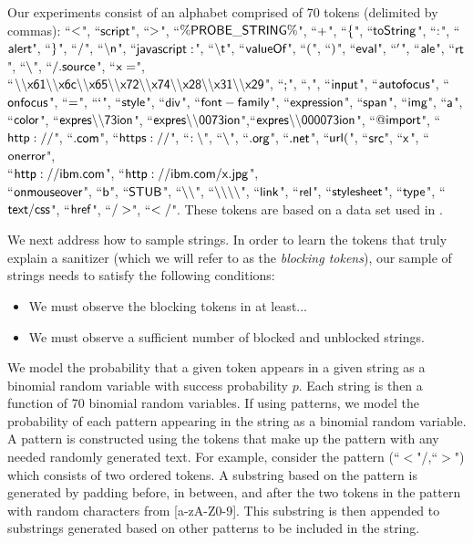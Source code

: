 Our experiments consist of an alphabet comprised of 70 tokens (delimited by commas): ``$\sf{<}$", ``$\sf{script}$", ``$\sf{>}$", ``$\sf{\%PROBE\_STRING\%}$", ``$\sf{+}$", ``$\sf{\{}$", ``$\sf{toString}$", ``$\sf{:}$", ``$\sf{alert}$", ``$\sf{\}}$", ``$\sf{/}$", ``$\sf{\backslash n}$", ``$\sf{javascript:}$", ``$\sf{\backslash t}$", ``$\sf{valueOf}$", ``$\sf{(}$", ``$\sf{)}$", ``$\sf{eval}$", ``$\sf{'}$", ``$\sf{ale}$", ``$\sf{rt}$", ``$\sf{\backslash }$", ``$\sf{/.source}$", ``$\sf{x=}$",\\ ``$\sf{\backslash \backslash x61\backslash \backslash x6c\backslash \backslash x65\backslash \backslash x72\backslash \backslash x74\backslash \backslash x28\backslash \backslash x31\backslash \backslash x29}$", ``$\sf{;}$", ``$\sf{,}$", ``$\sf{input}$", ``$\sf{autofocus}$", ``$\sf{onfocus}$", ``$\sf{=}$", ``$\sf{`}$", ``$\sf{style}$", ``$\sf{div}$", ``$\sf{font-family}$", ``$\sf{expression}$", ``$\sf{span}$", ``$\sf{img}$", ``$\sf{a}$", ``$\sf{color}$", ``$\sf{expres\backslash \backslash 73ion}$", ``$\sf{expres\backslash \backslash 0073ion}$",``$\sf{expres\backslash \backslash 000073ion}$", ``$\sf{@import}$", ``$\sf{http://}$", ``$\sf{.com}$", ``$\sf{https://}$", ``$\sf{:\backslash }$", ``$\sf{\backslash }$", ``$\sf{.org}$", ``$\sf{.net}$", ``$\sf{url(}$", ``$\sf{src}$", ``$\sf{x}$", ``$\sf{onerror}$",\\ ``$\sf{http://ibm.com}$", ``$\sf{http://ibm.com/x.jpg}$",\\ ``$\sf{onmouseover}$", ``$\sf{b}$", ``$\sf{STUB}$", ``$\sf{\backslash \backslash }$", ``$\sf{\backslash \backslash \backslash \backslash }$", ``$\sf{link}$", ``$\sf{rel}$", ``$\sf{stylesheet}$", ``$\sf{type}$", ``$\sf{text/css}$", ``$\sf{href}$", ``$\sf{/>}$", ``$\sf{</}$". These tokens are based on a data set used in \cite{TrippIssta:2013}.

We next address how to sample strings. In order to learn the tokens that truly explain a sanitizer (which we will refer to as the \emph{blocking tokens}), our sample of strings needs to satisfy the following conditions: 
\begin{itemize}
	\item We must observe the blocking tokens in at least...
	\item We must observe a sufficient number of blocked and unblocked strings. 	
\end{itemize} 
We model the probability that a given token appears in a given string as a binomial random variable with success probability $p$. Each string is then a function of 70 binomial random variables. If using patterns, we model the probability of each pattern appearing in the string as a binomial random variable. A pattern is constructed using the tokens that make up the pattern with any needed randomly generated text.  For example, consider the pattern (``$<$"/,``$>$") which consists of two ordered tokens. A substring based on the pattern is generated by padding before, in between, and after the two tokens in the pattern with random characters from [a-zA-Z0-9]. This substring is then appended to substrings generated based on other patterns to be included in the string. 

